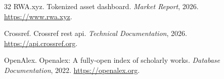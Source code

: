 \documentclass[11pt]{article}
\begin{document}
\begin{thebibliography}{32}
RWA.xyz.
\newblock Tokenized asset dashboard.
\newblock \emph{Market Report}, 2026.
\newblock \url{https://www.rwa.xyz}.

Crossref.
\newblock Crossref rest api.
\newblock \emph{Technical Documentation}, 2026.
\newblock \url{https://api.crossref.org}.

OpenAlex.
\newblock Openalex: A fully-open index of scholarly works.
\newblock \emph{Database Documentation}, 2022.
\newblock \url{https://openalex.org}.

\end{thebibliography}
\end{document}
